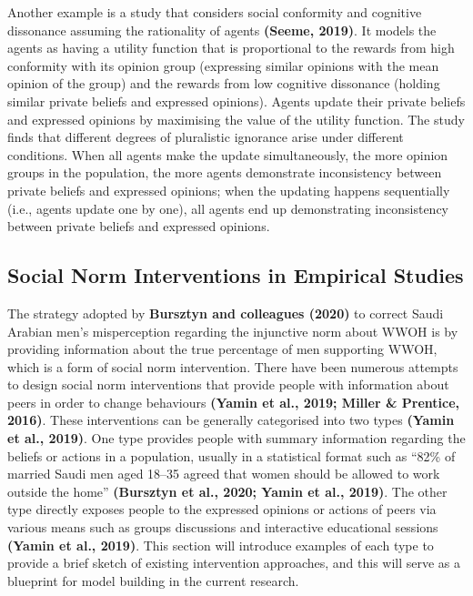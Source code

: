 \documentclass[
  11pt,
]{article}
\begin{document}
Another example is a study that considers social conformity and
cognitive dissonance assuming the rationality of agents \textbf{(Seeme,
2019)}. It models the agents as having a utility function that is
proportional to the rewards from high conformity with its opinion group
(expressing similar opinions with the mean opinion of the group) and the
rewards from low cognitive dissonance (holding similar private beliefs
and expressed opinions). Agents update their private beliefs and
expressed opinions by maximising the value of the utility function. The
study finds that different degrees of pluralistic ignorance arise under
different conditions. When all agents make the update simultaneously,
the more opinion groups in the population, the more agents demonstrate
inconsistency between private beliefs and expressed opinions; when the
updating happens sequentially (i.e., agents update one by one), all
agents end up demonstrating inconsistency between private beliefs and
expressed opinions.

\hypertarget{social-norm-interventions-in-empirical-studies}{%
\subsection{Social Norm Interventions in Empirical
Studies}\label{social-norm-interventions-in-empirical-studies}}

The strategy adopted by \textbf{Bursztyn and colleagues (2020)} to
correct Saudi Arabian men's misperception regarding the injunctive norm
about WWOH is by providing information about the true percentage of men
supporting WWOH, which is a form of social norm intervention. There have
been numerous attempts to design social norm interventions that provide
people with information about peers in order to change behaviours
\textbf{(Yamin et al., 2019; Miller \& Prentice, 2016)}. These
interventions can be generally categorised into two types \textbf{(Yamin
et al., 2019)}. One type provides people with summary information
regarding the beliefs or actions in a population, usually in a
statistical format such as ``82\% of married Saudi men aged 18--35
agreed that women should be allowed to work outside the home''
\textbf{(Bursztyn et al., 2020; Yamin et al., 2019)}. The other type
directly exposes people to the expressed opinions or actions of peers
via various means such as groups discussions and interactive educational
sessions \textbf{(Yamin et al., 2019)}. This section will introduce
examples of each type to provide a brief sketch of existing intervention
approaches, and this will serve as a blueprint for model building in the
current research.
\end{document}
